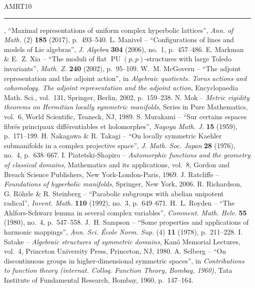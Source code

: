\begin{thebibliography}{AMRT10}
 \rule{1.2em}{.1pt}, ``Maximal representations of uniform complex hyperbolic lattices'', \emph{Ann. of Math.} (2) \textbf{185} (2017), p.~493--540.
 L. Manivel -- ``Configurations of lines and models of Lie algebras'', \emph{J. Algebra} \textbf{304} (2006), no.~1, p.~457--486.
 E. Markman \& E.~Z. Xia -- ``The moduli of flat $\operatorname{PU}(p,p)$-structures with large Toledo invariants'', \emph{Math. Z.} \textbf{240} (2002), p.~95--109.
 W.~M. McGovern -- ``The adjoint representation and the adjoint action'', in \emph{Algebraic quotients. Torus actions and cohomology. The adjoint representation and the adjoint action}, Encyclopaedia Math. Sci., vol.~131, Springer, Berlin, 2002, p.~159--238.
 N. Mok -- \emph{Metric rigidity theorems on Hermitian locally symmetric manifolds}, Series in Pure Mathematics, vol.~6, World Scientific, Teaneck, NJ, 1989.
 S. Murakami -- ``Sur certains espaces fibrés principaux différentiables et holomorphes'', \emph{Nagoya Math. J.} \textbf{15} (1959), p.~171--199.
 H. Nakagawa \& R. Takagi -- ``On locally symmetric Kaehler submanifolds in a complex projective space'', \emph{J. Math. Soc. Japan} \textbf{28} (1976), no.~4, p.~638--667.
 I. Piatetski-Shapiro -- \emph{Automorphic functions and the geometry of classical domains}, Mathematics and its applications, vol.~8, Gordon and Breach Science Publishers, New York-London-Paris, 1969.
 J. Ratcliffe -- \emph{Foundations of hyperbolic manifolds}, Springer, New York, 2006.
 R. Richardson, G. Röhrle \& R. Steinberg -- ``Parabolic subgroups with abelian unipotent radical'', \emph{Invent. Math.} \textbf{110} (1992), no.~3, p.~649--671.
 H.~L. Royden -- ``The Ahlfors-Schwarz lemma in several complex variables'', \emph{Comment. Math. Helv.} \textbf{55} (1980), no.~4, p.~547--558.
 J.~H. Sampson -- ``Some properties and applications of harmonic mappings'', \emph{Ann. Sci. École Norm. Sup.} (4) \textbf{11} (1978), p.~211--228.
 I. Satake -- \emph{Algebraic structures of symmetric domains}, Kanô Memorial Lectures, vol.~4, Princeton University Press, Princeton, NJ, 1980.
 A. Selberg -- ``On discontinuous groups in higher-dimensional symmetric spaces'', in \emph{Contributions to function theory (internat. Colloq. Function Theory, Bombay, 1960)}, Tata Institute of Fundamental Research, Bombay, 1960, p.~147--164.

\end{thebibliography}
